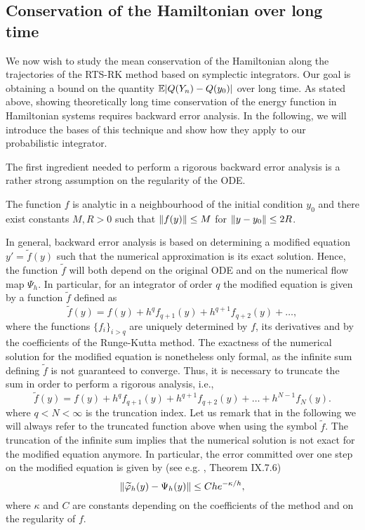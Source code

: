 \documentclass[10pt]{article}
\begin{document}
\subsection{Conservation of the Hamiltonian over long time} We now wish to study the mean conservation of the Hamiltonian along the trajectories of the RTS-RK method based on symplectic integrators. Our goal is obtaining a bound on the quantity $\operatorname{\mathbb{E}}\lvert Q(Y_n) - Q(y_0)\rvert$ over long time. As stated above, showing theoretically long time conservation of the energy function in Hamiltonian systems requires backward error analysis. In the following, we will introduce the bases of this technique and show how they apply to our probabilistic integrator. 

The first ingredient needed to perform a rigorous backward error analysis is a rather strong assumption on the regularity of the ODE.
\begin{assumption}\label{as:RegHamiltonian} The function $f$ is analytic in a neighbourhood of the initial condition $y_0$ and there exist constants $M, R > 0$ such that $\lVert f(y)\rVert \leq M$ for $\lVert y - y_0\rVert \leq 2R$.
\end{assumption}
In general, backward error analysis is based on determining a modified equation $y' = \tilde f(y)$ such that the numerical approximation is its exact solution. Hence, the function $\tilde f$ will both depend on the original ODE and on the numerical flow map $\Psi_h$. In particular, for an integrator of order $q$ the modified equation is given by a function $\tilde f$ defined as
\begin{equation}
\tilde f(y) = f(y) + h^q f_{q+1}(y) + h^{q+1} f_{q+2}(y) + \ldots,
\end{equation}
where the functions $\{f_i\}_{i>q}$ are uniquely determined by $f$, its derivatives and by the coefficients of the Runge-Kutta method. The exactness of the numerical solution for the modified equation is nonetheless only formal, as the infinite sum defining $\tilde f$ is not guaranteed to converge. Thus, it is necessary to truncate the sum in order to perform a rigorous analysis, i.e.,
\begin{equation}
\tilde f(y) = f(y) + h^q f_{q+1}(y) + h^{q+1} f_{q+2}(y) + \ldots + h^{N-1}f_N(y).
\end{equation}
where $q < N < \infty$ is the truncation index. Let us remark that in the following we will always refer to the truncated function above when using the symbol $\tilde f$. The truncation of the infinite sum implies that the numerical solution is not exact for the modified equation anymore. In particular, the error committed over one step on the modified equation is given by (see e.g. \cite{HLW06}, Theorem IX.7.6)
\begin{equation}\label{eq:OneStepModEq}
	 \lVert\widetilde {\varphi}_h(y) - \Psi_h(y)\rVert \leq Che^{-\kappa/h},
\end{equation}
where $\kappa$ and $C$ are constants depending on the coefficients of the method and on the regularity of $f$.
\end{document}
